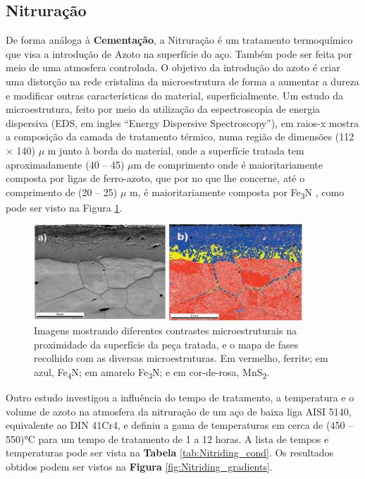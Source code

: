 \subsection{Nitruração}

De forma análoga à \textbf{Cementação}, a Nitruração é um tratamento termoquímico que visa a introdução de Azoto na superfície do aço. Também pode ser feita por meio de uma atmosfera controlada. O objetivo da introdução do azoto é criar uma distorção na rede cristalina da microestrutura de forma a aumentar a dureza e modificar outras características do material, superficialmente. Um estudo da microestrutura, feito por meio da utilização da espectroscopia de energia dispersiva (EDS, em ingles “Energy Dispersive Spectroscopy”), em raios-x mostra a composição da camada de tratamento térmico, numa região de dimensões (112 × 140) $\mu$ m junto à borda do material, onde a superfície tratada tem aproximadamente (40 – 45) $\mu$m de comprimento onde é maioritariamente composta por ligas de ferro-azoto, que por no que lhe concerne, até o comprimento de (20 – 25) $\mu$ m, é maioritariamente composta por Fe\textsubscript{3}N \cite{EDAX2023}, como pode ser visto na Figura \ref{fig:Nitriding_3_microstructure}.
\begin{figure}[htb]
    \centering
    \includegraphics[width = 0.9\textwidth]{Figures/Cap2/Nitriding_3_microstructure.png}
    \caption[Microestruturas de uma peça tratada por nitruração]%
    {Imagens mostrando diferentes contrastes microestruturais na proximidade da superfície da peça tratada\cite{EDAX2023}, e o mapa de fases recolhido com as diversas microestruturas. Em vermelho, ferrite; em azul, Fe\textsubscript{4}N; em amarelo Fe\textsubscript{3}N; e em cor-de-rosa, MnS\textsubscript{2}.}
    \label{fig:Nitriding_3_microstructure}
\end{figure}
\newpage
\par
Outro estudo investigou a influência do tempo de tratamento, a temperatura e o volume de azoto na atmosfera da nitruração de um aço de baixa liga AISI 5140, equivalente ao DIN 41Cr4, e definiu a gama de temperaturas em cerca de (450 – 550)°C para um tempo de tratamento de 1 a 12 horas\cite{Karaoglu2002}. A lista de tempos e temperaturas pode ser vista na \textbf{Tabela} \ref{tab:Nitriding_cond}. Os resultados obtidos podem ser vistos na \textbf{Figura} \ref{fig:Nitriding_gradients}.
